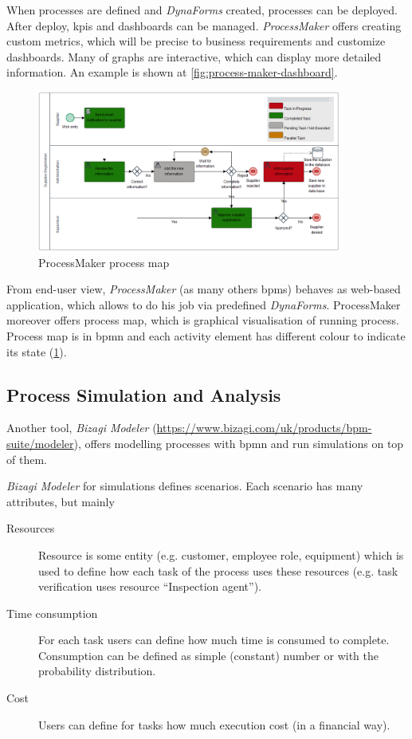  When processes are defined and \textit{DynaForms} created, processes can be deployed. After deploy, \gls{kpi}s and dashboards can be managed. \textit{ProcessMaker} offers creating custom metrics, which will be precise to business requirements and customize dashboards. Many of graphs are interactive, which can display more detailed information. An example is shown at \cref{fig:process-maker-dashboard}.
 
 \begin{figure}[ht!]
	\centering
    \includegraphics[width=10cm, keepaspectratio]{img/process-maker-map.PNG}
    \caption{ProcessMaker process map}
    \label{fig:process-maker-process-map}
\end{figure} 
 
 From end-user view, \textit{ProcessMaker} (as many others \gls{bpms}) behaves as web-based application, which allows to do his job via predefined \textit{DynaForms}. ProcessMaker moreover offers process map, which is graphical visualisation of running process. Process map is in \gls{bpmn} and each activity element has different colour to indicate its state (\cref{fig:process-maker-process-map}).
 
\subsection{Process Simulation and Analysis}
Another tool, \textit{Bizagi Modeler} (\href{https://www.bizagi.com/uk/products/bpm-suite/modeler}{https://www.bizagi.com/uk/products/bpm-suite/modeler}), offers modelling processes with \gls{bpmn} and run simulations on top of them.

\textit{Bizagi Modeler} for simulations defines scenarios. Each scenario has many attributes, but mainly
\begin{description}
    \item[Resources] Resource is some entity (e.g. customer, employee role, equipment) which is used to define how each task of the process uses these resources (e.g. task verification uses resource ``Inspection agent'').
    \item[Time consumption] For each task users can define how much time is consumed to complete. Consumption can be defined as simple (constant) number or with the probability distribution.
    \item[Cost] Users can define for tasks how much execution cost (in a financial way).    
\end{description}

